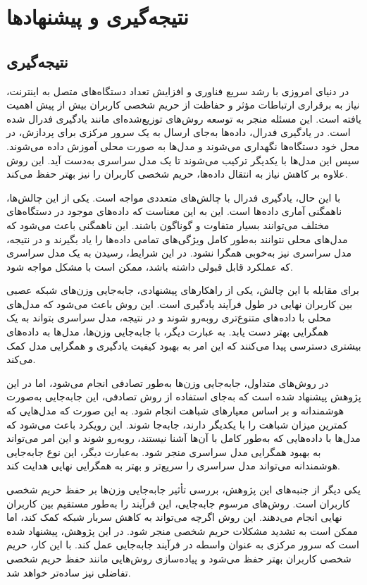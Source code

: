 \chapter{نتیجه‌گیری و پیشنهاد‌ها}

\section{نتیجه‌گیری}

در دنیای امروزی با رشد سریع فناوری و افزایش تعداد دستگاه‌های متصل به اینترنت، نیاز به برقراری ارتباطات مؤثر و حفاظت از حریم شخصی کاربران بیش از پیش اهمیت یافته است. این مسئله منجر به توسعه روش‌های توزیع‌شده‌ای مانند یادگیری فدرال شده است. در یادگیری فدرال، داده‌ها به‌جای ارسال به یک سرور مرکزی برای پردازش، در محل خود دستگاه‌ها نگهداری می‌شوند و مدل‌ها به صورت محلی آموزش داده می‌شوند. سپس این مدل‌ها با یکدیگر ترکیب می‌شوند تا یک مدل سراسری به‌دست آید. این روش علاوه بر کاهش نیاز به انتقال داده‌ها، حریم شخصی کاربران را نیز بهتر حفظ می‌کند.

با این حال، یادگیری فدرال با چالش‌های متعددی مواجه است. یکی از این چالش‌ها، ناهمگنی آماری داده‌ها است. این به این معناست که داده‌های موجود در دستگاه‌های مختلف می‌توانند بسیار متفاوت و گوناگون باشند. این ناهمگنی باعث می‌شود که مدل‌های محلی نتوانند به‌طور کامل ویژگی‌های تمامی داده‌ها را یاد بگیرند و در نتیجه، مدل سراسری نیز به‌خوبی همگرا نشود. در این شرایط، رسیدن به یک مدل سراسری که عملکرد قابل قبولی داشته باشد، ممکن است با مشکل مواجه شود.

برای مقابله با این چالش، یکی از راهکارهای پیشنهادی، جابه‌جایی وزن‌های شبکه عصبی بین کاربران نهایی در طول فرآیند یادگیری است. این روش باعث می‌شود که مدل‌های محلی با داده‌های متنوع‌تری روبه‌رو شوند و در نتیجه، مدل سراسری بتواند به یک همگرایی بهتر دست یابد. به عبارت دیگر، با جابه‌جایی وزن‌ها، مدل‌ها به داده‌های بیشتری دسترسی پیدا می‌کنند که این امر به بهبود کیفیت یادگیری و همگرایی مدل کمک می‌کند.

در روش‌های متداول، جابه‌جایی وزن‌ها به‌طور تصادفی انجام می‌شود، اما در این پژوهش پیشنهاد شده است که به‌جای استفاده از روش تصادفی، این جابه‌جایی به‌صورت هوشمندانه و بر اساس معیارهای شباهت انجام شود. به این صورت که مدل‌هایی که کمترین میزان شباهت را با یکدیگر دارند، جابه‌جا شوند. این رویکرد باعث می‌شود که مدل‌ها با داده‌هایی که به‌طور کامل با آن‌ها آشنا نیستند، روبه‌رو شوند و این امر می‌تواند به بهبود همگرایی مدل سراسری منجر شود. به‌عبارت دیگر، این نوع جابه‌جایی هوشمندانه می‌تواند مدل سراسری را سریع‌تر و بهتر به همگرایی نهایی هدایت کند.

یکی دیگر از جنبه‌های این پژوهش، بررسی تأثیر جابه‌جایی وزن‌ها بر حفظ حریم شخصی کاربران است. روش‌های مرسوم جابه‌جایی، این فرآیند را به‌طور مستقیم بین کاربران نهایی انجام می‌دهند. این روش اگرچه می‌تواند به کاهش سربار شبکه کمک کند، اما ممکن است به تشدید مشکلات حریم شخصی منجر شود. در این پژوهش، پیشنهاد شده است که سرور مرکزی به عنوان واسطه در فرآیند جابه‌جایی عمل کند. با این کار، حریم شخصی کاربران بهتر حفظ می‌شود و پیاده‌سازی روش‌هایی مانند حفظ حریم شخصی تفاضلی نیز ساده‌تر خواهد شد.

